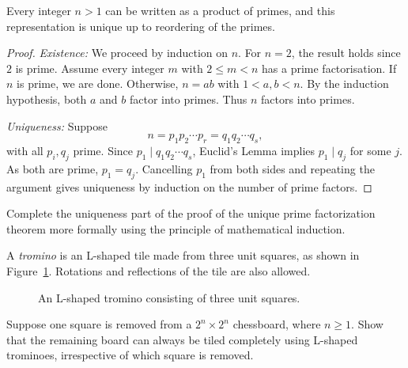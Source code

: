 \begin{theorem}
\label{thm:primefactor}
Every integer $n > 1$ can be written as a product of primes, and this representation is unique up to reordering of the primes.
\end{theorem}

\begin{proof}
\emph{Existence:} We proceed by induction on $n$. For $n=2$, the result holds since $2$ is prime. 
Assume every integer $m$ with $2 \le m < n$ has a prime factorisation. 
If $n$ is prime, we are done. Otherwise, $n=ab$ with $1<a,b<n$. By the induction hypothesis, both $a$ and $b$ factor into primes. 
Thus $n$ factors into primes.

\emph{Uniqueness:} Suppose
\[
n = p_1 p_2 \cdots p_r = q_1 q_2 \cdots q_s,
\]
with all $p_i, q_j$ prime. 
Since $p_1 \mid q_1 q_2 \cdots q_s$, Euclid's Lemma implies $p_1 \mid q_j$ for some $j$. 
As both are prime, $p_1=q_j$. Cancelling $p_1$ from both sides and repeating the argument gives uniqueness by induction on the number of prime factors.
\end{proof}

\begin{exercise}
Complete the uniqueness part of the proof of the unique prime factorization theorem more formally using the principle of mathematical induction.
\end{exercise}

\begin{theorem}
\label{thm:tromino}
 A \emph{tromino} is an L-shaped tile made from three unit squares, as shown in Figure~\ref{fig:tromino}. Rotations and reflections of the tile are also allowed.

\begin{figure}[ht]
\centering
{}
\caption{An L-shaped tromino consisting of three unit squares.}
\label{fig:tromino}
\end{figure}

Suppose one square is removed from a $2^n\times2^n$  chessboard,
where $n\geq1$. Show that the remaining board can always be tiled completely
using L-shaped trominoes, irrespective of which square is removed.
\end{theorem}


